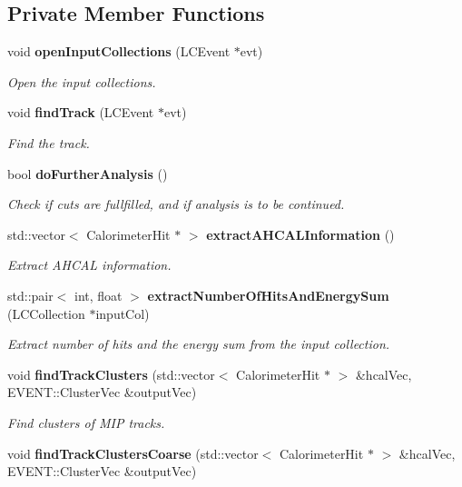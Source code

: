 \subsection*{Private Member Functions}
\begin{DoxyCompactItemize}
\item 
void {\bf open\-Input\-Collections} (L\-C\-Event $\ast$evt)
\begin{DoxyCompactList}\small\item\em Open the input collections. \end{DoxyCompactList}\item 
void {\bf find\-Track} (L\-C\-Event $\ast$evt)
\begin{DoxyCompactList}\small\item\em Find the track. \end{DoxyCompactList}\item 
bool {\bf do\-Further\-Analysis} ()
\begin{DoxyCompactList}\small\item\em Check if cuts are fullfilled, and if analysis is to be continued. \end{DoxyCompactList}\item 
std\-::vector$<$ Calorimeter\-Hit $\ast$ $>$ {\bf extract\-A\-H\-C\-A\-L\-Information} ()\label{classCALICE_1_1AngleTrackFinder_a86fc7e637d10c7ee1ab9851b1fc54e1b}

\begin{DoxyCompactList}\small\item\em Extract A\-H\-C\-A\-L information. \end{DoxyCompactList}\item 
std\-::pair$<$ int, float $>$ {\bf extract\-Number\-Of\-Hits\-And\-Energy\-Sum} (L\-C\-Collection $\ast$input\-Col)
\begin{DoxyCompactList}\small\item\em Extract number of hits and the energy sum from the input collection. \end{DoxyCompactList}\item 
void {\bf find\-Track\-Clusters} (std\-::vector$<$ Calorimeter\-Hit $\ast$ $>$ \&hcal\-Vec, E\-V\-E\-N\-T\-::\-Cluster\-Vec \&output\-Vec)
\begin{DoxyCompactList}\small\item\em Find clusters of M\-I\-P tracks. \end{DoxyCompactList}\item 
void {\bfseries find\-Track\-Clusters\-Coarse} (std\-::vector$<$ Calorimeter\-Hit $\ast$ $>$ \&hcal\-Vec, E\-V\-E\-N\-T\-::\-Cluster\-Vec \&output\-Vec)\label{classCALICE_1_1AngleTrackFinder_a2a052d786ad1c5defe012d580f9da5d1}


\end{DoxyCompactItemize}
